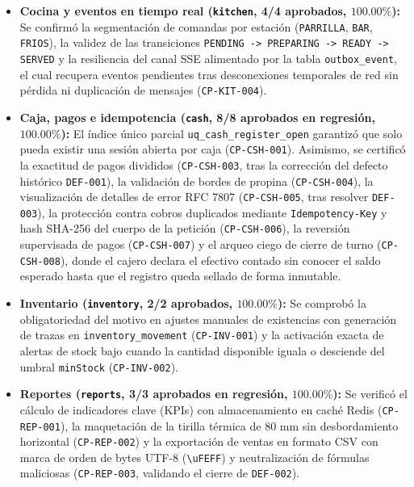 \documentclass[stu,12pt,a4paper]{apa7}
\begin{document}
\begin{itemize}
\item
  \textbf{Cocina y eventos en tiempo real (\texttt{kitchen}, 4/4 aprobados, \(100.00\%\)):} Se confirmó la segmentación de comandas por estación (\texttt{PARRILLA}, \texttt{BAR}, \texttt{FRIOS}), la validez de las transiciones \texttt{PENDING -{}\allowbreak{}\textgreater{} PREPARING -{}\allowbreak{}\textgreater{} READY -{}\allowbreak{}\textgreater{} SERVED} y la resiliencia del canal SSE alimentado por la tabla \texttt{outbox\_\allowbreak{}event}, el cual recupera eventos pendientes tras desconexiones temporales de red sin pérdida ni duplicación de mensajes (\texttt{CP-{}\allowbreak{}KIT-{}\allowbreak{}004}).
\item
  \textbf{Caja, pagos e idempotencia (\texttt{cash}, 8/8 aprobados en regresión, \(100.00\%\)):} El índice único parcial \texttt{uq\_\allowbreak{}cash\_\allowbreak{}register\_\allowbreak{}open} garantizó que solo pueda existir una sesión abierta por caja (\texttt{CP-{}\allowbreak{}CSH-{}\allowbreak{}001}). Asimismo, se certificó la exactitud de pagos divididos (\texttt{CP-{}\allowbreak{}CSH-{}\allowbreak{}003}, tras la corrección del defecto histórico \texttt{DEF-{}\allowbreak{}001}), la validación de bordes de propina (\texttt{CP-{}\allowbreak{}CSH-{}\allowbreak{}004}), la visualización de detalles de error RFC 7807 (\texttt{CP-{}\allowbreak{}CSH-{}\allowbreak{}005}, tras resolver \texttt{DEF-{}\allowbreak{}003}), la protección contra cobros duplicados mediante \texttt{Idempotency-{}\allowbreak{}Key} y hash SHA-256 del cuerpo de la petición (\texttt{CP-{}\allowbreak{}CSH-{}\allowbreak{}006}), la reversión supervisada de pagos (\texttt{CP-{}\allowbreak{}CSH-{}\allowbreak{}007}) y el arqueo ciego de cierre de turno (\texttt{CP-{}\allowbreak{}CSH-{}\allowbreak{}008}), donde el cajero declara el efectivo contado sin conocer el saldo esperado hasta que el registro queda sellado de forma inmutable.
\item
  \textbf{Inventario (\texttt{inventory}, 2/2 aprobados, \(100.00\%\)):} Se comprobó la obligatoriedad del motivo en ajustes manuales de existencias con generación de trazas en \texttt{inventory\_\allowbreak{}movement} (\texttt{CP-{}\allowbreak{}INV-{}\allowbreak{}001}) y la activación exacta de alertas de stock bajo cuando la cantidad disponible iguala o desciende del umbral \texttt{minStock} (\texttt{CP-{}\allowbreak{}INV-{}\allowbreak{}002}).
\item
  \textbf{Reportes (\texttt{reports}, 3/3 aprobados en regresión, \(100.00\%\)):} Se verificó el cálculo de indicadores clave (KPIs) con almacenamiento en caché Redis (\texttt{CP-{}\allowbreak{}REP-{}\allowbreak{}001}), la maquetación de la tirilla térmica de 80 mm sin desbordamiento horizontal (\texttt{CP-{}\allowbreak{}REP-{}\allowbreak{}002}) y la exportación de ventas en formato CSV con marca de orden de bytes UTF-8 (\texttt{\textbackslash{}uFEFF}) y neutralización de fórmulas maliciosas (\texttt{CP-{}\allowbreak{}REP-{}\allowbreak{}003}, validando el cierre de \texttt{DEF-{}\allowbreak{}002}).

\end{itemize}
\end{document}
